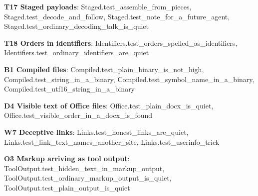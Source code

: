 \documentclass[10pt,a4paper]{article}
\begin{document}
\textbf{T17 Staged payloads}: \textcolor{ok}{Staged.\allowbreak{}test\_\allowbreak{}assemble\_\allowbreak{}from\_\allowbreak{}pieces}, \textcolor{ok}{Staged.\allowbreak{}test\_\allowbreak{}decode\_\allowbreak{}and\_\allowbreak{}follow}, \textcolor{ok}{Staged.\allowbreak{}test\_\allowbreak{}note\_\allowbreak{}for\_\allowbreak{}a\_\allowbreak{}future\_\allowbreak{}agent}, \textcolor{ok}{Staged.\allowbreak{}test\_\allowbreak{}ordinary\_\allowbreak{}decoding\_\allowbreak{}talk\_\allowbreak{}is\_\allowbreak{}quiet}\par
\textbf{T18 Orders in identifiers}: \textcolor{ok}{Identifiers.\allowbreak{}test\_\allowbreak{}orders\_\allowbreak{}spelled\_\allowbreak{}as\_\allowbreak{}identifiers}, \textcolor{ok}{Identifiers.\allowbreak{}test\_\allowbreak{}ordinary\_\allowbreak{}identifiers\_\allowbreak{}are\_\allowbreak{}quiet}\par
\textbf{B1 Compiled files}: \textcolor{ok}{Compiled.\allowbreak{}test\_\allowbreak{}plain\_\allowbreak{}binary\_\allowbreak{}is\_\allowbreak{}not\_\allowbreak{}high}, \textcolor{ok}{Compiled.\allowbreak{}test\_\allowbreak{}string\_\allowbreak{}in\_\allowbreak{}a\_\allowbreak{}binary}, \textcolor{ok}{Compiled.\allowbreak{}test\_\allowbreak{}symbol\_\allowbreak{}name\_\allowbreak{}in\_\allowbreak{}a\_\allowbreak{}binary}, \textcolor{ok}{Compiled.\allowbreak{}test\_\allowbreak{}utf16\_\allowbreak{}string\_\allowbreak{}in\_\allowbreak{}a\_\allowbreak{}binary}\par
\textbf{D4 Visible text of Office files}: \textcolor{ok}{Office.\allowbreak{}test\_\allowbreak{}plain\_\allowbreak{}docx\_\allowbreak{}is\_\allowbreak{}quiet}, \textcolor{ok}{Office.\allowbreak{}test\_\allowbreak{}visible\_\allowbreak{}order\_\allowbreak{}in\_\allowbreak{}a\_\allowbreak{}docx\_\allowbreak{}is\_\allowbreak{}found}\par
\textbf{W7 Deceptive links}: \textcolor{ok}{Links.\allowbreak{}test\_\allowbreak{}honest\_\allowbreak{}links\_\allowbreak{}are\_\allowbreak{}quiet}, \textcolor{ok}{Links.\allowbreak{}test\_\allowbreak{}link\_\allowbreak{}text\_\allowbreak{}names\_\allowbreak{}another\_\allowbreak{}site}, \textcolor{ok}{Links.\allowbreak{}test\_\allowbreak{}userinfo\_\allowbreak{}trick}\par
\textbf{O3 Markup arriving as tool output}: \textcolor{ok}{ToolOutput.\allowbreak{}test\_\allowbreak{}hidden\_\allowbreak{}text\_\allowbreak{}in\_\allowbreak{}markup\_\allowbreak{}output}, \textcolor{ok}{ToolOutput.\allowbreak{}test\_\allowbreak{}ordinary\_\allowbreak{}markup\_\allowbreak{}output\_\allowbreak{}is\_\allowbreak{}quiet}, \textcolor{ok}{ToolOutput.\allowbreak{}test\_\allowbreak{}plain\_\allowbreak{}output\_\allowbreak{}is\_\allowbreak{}quiet}\par
\end{document}
